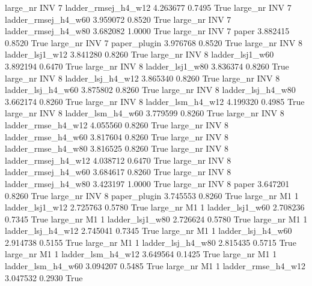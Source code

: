   large_nr      INV                 7 ladder_rmsej_h4_w12   4.263677      0.7495    True
  large_nr      INV                 7 ladder_rmsej_h4_w60   3.959072      0.8520    True
  large_nr      INV                 7 ladder_rmsej_h4_w80   3.682082      1.0000    True
  large_nr      INV                 7               paper   3.882415      0.8520    True
  large_nr      INV                 7        paper_plugin   3.976768      0.8520    True
  large_nr      INV                 8     ladder_lsj1_w12   3.841280      0.8260    True
  large_nr      INV                 8     ladder_lsj1_w60   3.892194      0.6470    True
  large_nr      INV                 8     ladder_lsj1_w80   3.836374      0.8260    True
  large_nr      INV                 8   ladder_lsj_h4_w12   3.865340      0.8260    True
  large_nr      INV                 8   ladder_lsj_h4_w60   3.875802      0.8260    True
  large_nr      INV                 8   ladder_lsj_h4_w80   3.662174      0.8260    True
  large_nr      INV                 8   ladder_lsm_h4_w12   4.199320      0.4985    True
  large_nr      INV                 8   ladder_lsm_h4_w60   3.779599      0.8260    True
  large_nr      INV                 8  ladder_rmse_h4_w12   4.055560      0.8260    True
  large_nr      INV                 8  ladder_rmse_h4_w60   3.817604      0.8260    True
  large_nr      INV                 8  ladder_rmse_h4_w80   3.816525      0.8260    True
  large_nr      INV                 8 ladder_rmsej_h4_w12   4.038712      0.6470    True
  large_nr      INV                 8 ladder_rmsej_h4_w60   3.684617      0.8260    True
  large_nr      INV                 8 ladder_rmsej_h4_w80   3.423197      1.0000    True
  large_nr      INV                 8               paper   3.647201      0.8260    True
  large_nr      INV                 8        paper_plugin   3.745553      0.8260    True
  large_nr       M1                 1     ladder_lsj1_w12   2.725763      0.5780    True
  large_nr       M1                 1     ladder_lsj1_w60   2.708236      0.7345    True
  large_nr       M1                 1     ladder_lsj1_w80   2.726624      0.5780    True
  large_nr       M1                 1   ladder_lsj_h4_w12   2.745041      0.7345    True
  large_nr       M1                 1   ladder_lsj_h4_w60   2.914738      0.5155    True
  large_nr       M1                 1   ladder_lsj_h4_w80   2.815435      0.5715    True
  large_nr       M1                 1   ladder_lsm_h4_w12   3.649564      0.1425    True
  large_nr       M1                 1   ladder_lsm_h4_w60   3.094207      0.5485    True
  large_nr       M1                 1  ladder_rmse_h4_w12   3.047532      0.2930    True
